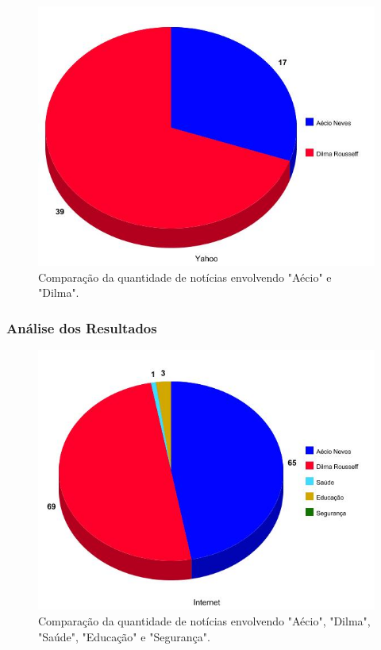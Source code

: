 \begin{frame}[fragile]
\begin{figure}
\includegraphics[width=0.4\paperheight]{graph-yahoo.jpg}
\caption{Comparação da quantidade de notícias envolvendo "Aécio" e "Dilma".}
\end{figure}
\end{frame}


\begin{frame}[fragile]
\frametitle{Análise dos Resultados}
\begin{figure} 
\includegraphics[width=0.6\paperheight]{graph-todos.jpg}
\caption{Comparação da quantidade de notícias envolvendo "Aécio", "Dilma", "Saúde", "Educação" e "Segurança".}
\end{figure}
\end{frame}

